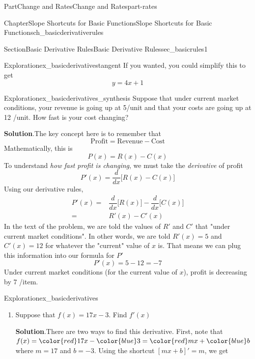 \documentclass{tufte-book}
\newcommand{\blocktitlefont}{\relax}
\numberwithin{equation}{chapter}
\newcommand{\red}[1]{   {\color{red}   #1}   }
\newcommand{\blue}[1]{  {\color{blue}  #1}  }
\newcommand{\ddx}[1]{ \dfrac{d}{dx} \Big[ #1 \Big]  }
\newcommand{\amp}{&}
\begin{document}
\begin{partptx}{Part}{Change and Rates}{}{Change and Rates}{}{}{part-rates}
\begin{chapterptx}{Chapter}{Slope Shortcuts for Basic Functions}{}{Slope Shortcuts for Basic Functions}{}{}{ch_basicderivativerules}
\begin{sectionptx}{Section}{Basic Derivative Rules}{}{Basic Derivative Rules}{}{}{sec_basicrules1}
\begin{exploration}{Exploration}{}{ex_basicderivativestangent}
If you wanted, you could simplify this to get%
\begin{equation*}
y = 4x + 1
\end{equation*}
%
\end{exploration}%
\begin{exploration}{Exploration}{}{ex_basicderivatives_synthesis}%
Suppose that under current market conditions, your revenue is going up at 5\textdollar{}\slash{}unit and that your costs are going up at 12 \textdollar{}\slash{}unit.  How fast is your cost changing?%
\par\smallskip%
\noindent\textbf{\blocktitlefont Solution}.\hypertarget{ex_basicderivatives_synthesis-2}{}\quad{}The key concept here is to remember that%
\begin{equation*}
\text{Profit} = \text{Revenue} - \text{Cost}
\end{equation*}
Mathematically, this is%
\begin{equation*}
P(x) = R(x) - C(x)
\end{equation*}
To understand \emph{how fast profit is changing}, we must take the \emph{derivative} of profit%
\begin{equation*}
P'(x) = \ddx{ R(x) - C(x) }
\end{equation*}
Using our derivative rules,%
\begin{align*}
P'(x) = \amp \ddx{R(x) } - \ddx{C(x)} \\
= \amp R'(x) - C'(x)
\end{align*}
In the text of the problem, we are told the values of \(R'\) and \(C'\) that "under current market conditions".  In other words, we are told \(R'(x) = 5\) and \(C'(x)=12\) for whatever the "current" value of \(x\) is.  That means we can plug this information into our formula for \(P'\)%
\begin{equation*}
P'(x) = 5 - 12 = -7
\end{equation*}
Under current market conditions (for the current value of \(x\)), profit is decreasing by 7 \textdollar{}\slash{}item.%
\end{exploration}%
\begin{exploration}{Exploration}{}{ex_basicderivatives}%
\begin{enumerate}[font=\bfseries,label=(\alph*),ref=\alph*]%
\item{}Suppose that \(f(x) = 17x - 3\).  Find \(f'(x)\)%
\par\smallskip%
\noindent\textbf{\blocktitlefont Solution}.\hypertarget{ex_basicderivatives-1-2}{}\quad{}There are two ways to find this derivative.  First, note that \(f(x) = \red{ 17} x - {\blue 3} = {\red m} x + {\blue b} \) where \(m=17\) and \(b=-3\).  Using the shortcut \([mx + b]' = m\), we get%

\end{enumerate}
\end{exploration}
\end{sectionptx}
\end{chapterptx}
\end{partptx}
\end{document}
